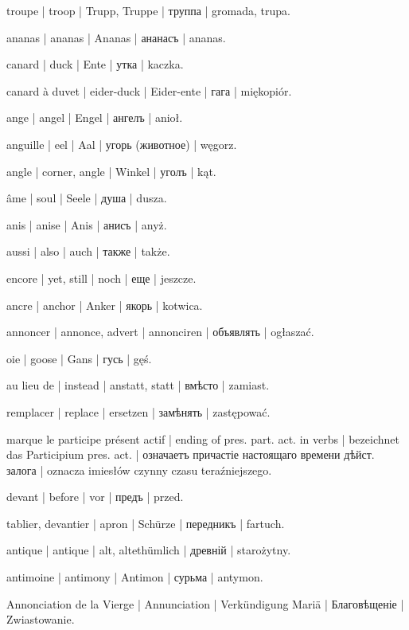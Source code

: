 \begin{outdent}{1em}
\uvsubentry{}
troupe | troop | Trupp, Truppe | труппа | gromada, trupa.

ananas | ananas | Ananas | ананасъ | ananas.

canard | duck | Ente | утка | kaczka.

\uvsubentry{}
canard à duvet | eider-duck | Eider-ente | гага | miękopiór.

ange | angel | Engel | ангелъ | anioł.

anguille | eel | Aal | угорь (животное) | węgorz.

angle | corner, angle | Winkel | уголъ | kąt.

âme | soul | Seele | душа | dusza.

anis | anise | Anis | анисъ | anyż.

aussi | also | auch | также | także.

encore | yet, still | noch | еще | jeszcze.

ancre | anchor | Anker | якорь | kotwica.

annoncer | annonce, advert | annonciren | объявлять | ogłaszać.

oie | goose | Gans | гусь | gęś.

au lieu de | instead | anstatt, statt | вмѣсто | zamiast.

\uvsubentry{}
remplacer | replace | ersetzen | замѣнять | zastępować.

marque le participe présent actif | ending of
pres. part. act. in verbs | bezeichnet das Participium pres. act. | означаетъ причастіе настоящаго времени дѣйст. залога | oznacza
imiesłów czynny czasu teraźniejszego.

devant | before | vor | предъ | przed.

\uvsubentry{}
tablier, devantier | apron | Schürze | передникъ | fartuch.

antique | antique | alt, altethümlich | древній | starożytny.

antimoine | antimony | Antimon | сурьма | antymon.

Annonciation de la Vierge | Annunciation | Verkündigung
Mariä | Благовѣщеніе | Zwiastowanie.


\end{outdent}
